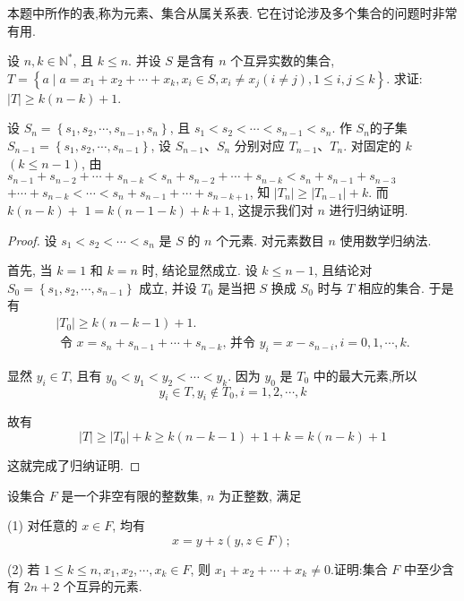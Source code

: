 \begin{note}
	本题中所作的表,称为元素、集合从属关系表. 它在讨论涉及多个集合的问题时非常有用.
\end{note}

\begin{example}
	设 $n, k \in \mathbb{N}^{*}$, 且 $k \leqslant n$. 并设 $S$ 是含有 $n$ 个互异实数的集合, $T=\left\{a \mid a=x_{1}+x_{2}+\cdots+x_{k}, x_{i} \in S, x_{i} \neq x_{j}(i \neq j), 1 \leqslant i, j \leqslant k\right\}$. 求证: $|T| \geqslant k(n-k)+1$.
\end{example}

\begin{analysis}
	设 $S_{n}=\left\{s_{1}, s_{2}, \cdots, s_{n-1}, s_{n}\right\}$, 且 $s_{1}<s_{2}<\cdots<s_{n-1}<s_{n}$. 作 $S_{n}$的子集 $S_{n-1}=\left\{s_{1}, s_{2}, \cdots, s_{n-1}\right\}$, 设 $S_{n-1} 、 S_{n}$ 分别对应 $T_{n-1} 、 T_{n}$. 对固定的 $k$ $(k \leqslant n-1)$, 由 $s_{n-1}+s_{n-2}+\cdots+s_{n-k}<s_{n}+s_{n-2}+\cdots+s_{n-k}<s_{n}+s_{n-1}+s_{n-3}$ $+\cdots+s_{n-k}<\cdots<s_{n}+s_{n-1}+\cdots+s_{n-k+1}$, 知 $\left|T_{n}\right| \geqslant\left|T_{n-1}\right|+k$. 而 $k(n-k)+$ $1=k(n-1-k)+k+1$, 这提示我们对 $n$ 进行归纳证明.
\end{analysis}

\begin{proof}
	设 $s_{1}<s_{2}<\cdots<s_{n}$ 是 $S$ 的 $n$ 个元素. 对元素数目 $n$ 使用数学归纳法.

	首先, 当 $k=1$ 和 $k=n$ 时, 结论显然成立. 设 $k \leqslant n-1$, 且结论对 $S_{0}=\left\{s_{1}, s_{2}, \cdots, s_{n-1}\right\}$ 成立, 并设 $T_{0}$ 是当把 $S$ 换成 $S_{0}$ 时与 $T$ 相应的集合. 于是有
	$$
		\begin{gathered}
			\left|T_{0}\right| \geqslant k(n-k-1)+1 . \\
			\text { 令 } x=s_{n}+s_{n-1}+\cdots+s_{n-k} \text {, 并令 } y_{i}=x-s_{n-i}, i=0,1, \cdots, k .
		\end{gathered}
	$$

	显然 $y_{i} \in T$, 且有 $y_{0}<y_{1}<y_{2}<\cdots<y_{k}$. 因为 $y_{0}$ 是 $T_{0}$ 中的最大元素,所以
	$$
		y_{i} \in T, y_{i} \notin T_{0}, i=1,2, \cdots, k
	$$

	故有
	$$
		|T| \geqslant\left|T_{0}\right|+k \geqslant k(n-k-1)+1+k=k(n-k)+1
	$$

	这就完成了归纳证明.
\end{proof}

\begin{example}
	设集合 $F$ 是一个非空有限的整数集, $n$ 为正整数, 满足
	
	(1) 对任意的 $x \in F$, 均有
	$$
		x=y+z(y, z \in F) \text {; }
	$$

	(2) 若 $1 \leqslant k \leqslant n, x_{1}, x_{2}, \cdots, x_{k} \in F$, 则 $x_{1}+x_{2}+\cdots+x_{k} \neq 0$.证明:集合 $F$ 中至少含有 $2 n+2$ 个互异的元素.
\end{example}

